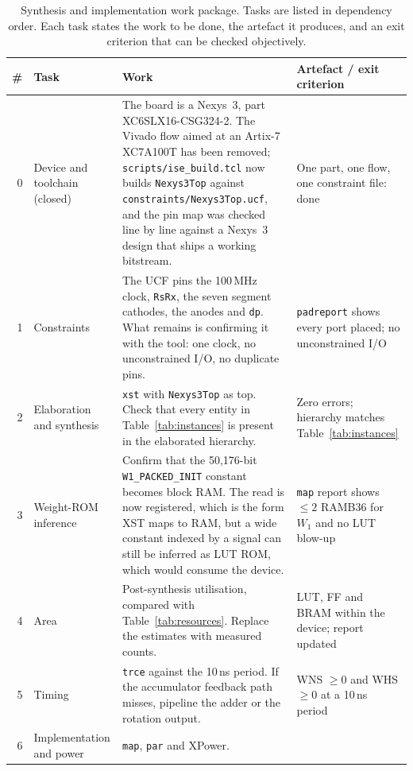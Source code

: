 \documentclass[11pt,a4paper]{article}
\begin{document}
\begin{table}[H]
\centering
\small
\caption{Synthesis and implementation work package. Tasks are listed in
  dependency order. Each task states the work to be done, the artefact it
  produces, and an exit criterion that can be checked objectively.}
\label{tab:roadmap}
\renewcommand{\arraystretch}{1.18}
\begin{tabularx}{\linewidth}{@{}r
  >{\raggedright\arraybackslash}p{3.2cm} L
  >{\raggedright\arraybackslash}p{4.0cm}@{}}
\toprule
\textbf{\#} & \textbf{Task} & \textbf{Work} & \textbf{Artefact / exit criterion} \\
 & Device and toolchain (closed) & The board is a Nexys~3, part
  XC6SLX16-CSG324-2. The Vivado flow aimed at an Artix-7 XC7A100T has been
  removed; \texttt{scripts/ise\_build.tcl} now builds \texttt{Nexys3Top}
  against \texttt{constraints/Nexys3Top.ucf}, and the pin map was checked line
  by line against a Nexys~3 design that ships a working bitstream.
  & One part, one flow, one constraint file: done \\
1 & Constraints & The UCF pins the 100\,MHz clock, \texttt{RsRx}, the seven
  segment cathodes, the anodes and \texttt{dp}. What remains is confirming it
  with the tool: one clock, no unconstrained I/O, no duplicate pins.
  & \texttt{padreport} shows every port placed; no unconstrained I/O \\
2 & Elaboration and synthesis & \texttt{xst} with \texttt{Nexys3Top} as top.
  Check that every entity in Table~\ref{tab:instances} is present in the
  elaborated hierarchy.
  & Zero errors; hierarchy matches Table~\ref{tab:instances} \\
3 & Weight-ROM inference & Confirm that the 50{,}176-bit
  \texttt{W1\_PACKED\_INIT} constant becomes block RAM. The read is now
  registered, which is the form XST maps to RAM, but a wide constant indexed by
  a signal can still be inferred as LUT ROM, which would consume the device.
  & \texttt{map} report shows $\le 2$ RAMB36 for $W_1$ and no LUT blow-up \\
4 & Area & Post-synthesis utilisation, compared with
  Table~\ref{tab:resources}. Replace the estimates with measured counts.
  & LUT, FF and BRAM within the device; report updated \\
5 & Timing & \texttt{trce} against the 10\,ns period. If the accumulator
  feedback path misses, pipeline the adder or the rotation output.
  & WNS $\ge 0$ and WHS $\ge 0$ at a 10\,ns period \\
6 & Implementation and power & \texttt{map}, \texttt{par} and XPower.

\end{tabularx}
\end{table}
\end{document}
